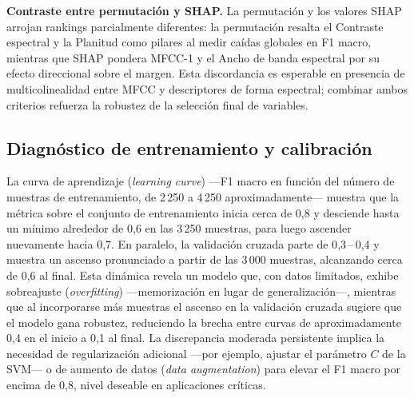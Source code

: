 \documentclass[12pt, letterpaper]{report}
\begin{document}
\textbf{Contraste entre permutación y SHAP.} La permutación y los valores SHAP arrojan rankings parcialmente diferentes: la permutación resalta el Contraste espectral y la Planitud como pilares al medir caídas globales en F1 macro, mientras que SHAP pondera MFCC-1 y el Ancho de banda espectral por su efecto direccional sobre el margen. Esta discordancia es esperable en presencia de multicolinealidad entre MFCC y descriptores de forma espectral; combinar ambos criterios refuerza la robustez de la selección final de variables.

\subsection{Diagnóstico de entrenamiento y calibración}

La curva de aprendizaje (\textit{learning curve}) ---F1 macro en función del número de muestras de entrenamiento, de 2\,250 a 4\,250 aproximadamente--- muestra que la métrica sobre el conjunto de entrenamiento inicia cerca de 0{,}8 y desciende hasta un mínimo alrededor de 0{,}6 en las 3\,250 muestras, para luego ascender nuevamente hacia 0{,}7. En paralelo, la validación cruzada parte de 0{,}3\,--\,0{,}4 y muestra un ascenso pronunciado a partir de las 3\,000 muestras, alcanzando cerca de 0{,}6 al final. Esta dinámica revela un modelo que, con datos limitados, exhibe sobreajuste (\textit{overfitting}) ---memorización en lugar de generalización---, mientras que al incorporarse más muestras el ascenso en la validación cruzada sugiere que el modelo gana robustez, reduciendo la brecha entre curvas de aproximadamente 0{,}4 en el inicio a 0{,}1 al final. La discrepancia moderada persistente implica la necesidad de regularización adicional ---por ejemplo, ajustar el parámetro $C$ de la SVM--- o de aumento de datos (\textit{data augmentation}) para elevar el F1 macro por encima de 0{,}8, nivel deseable en aplicaciones críticas.
\end{document}
